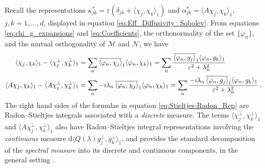 \documentclass[11pt]{amsart}
\renewcommand{\d}{\mathrm{d}}
\renewcommand{\Mc}{\mathcal{M}}
\newcommand{\Nc}{\mathcal{N}}
\begin{document}
Recall the representations $\kappa^*_{jk}=\varepsilon(\delta_{jk}+\langle\chi_j,\chi_k\rangle_1)$ and
$\alpha^*_{jk}=\langle A\chi_j,\chi_k\rangle_1$, $j,k=1,\ldots,d$, displayed in equation 
\eqref{eq:Eff_Diffusivity_Sobolev}. From equations
\eqref{eq:chi_g_expansions} and \eqref{eq:Coefficients}, the
orthonormality of the set $\{\varphi_n\}$, and the mutual orthogonality of
$\Mc$ and $\Nc$, we have 
%
\begin{align}\label{eq:Stieltjes-Radon_Rep}
  \langle\chi_j,\chi_k\rangle_1-\langle\chi_j^\perp,\chi_k^\perp\rangle_1&=\sum_n\overline{\langle\varphi_n,\chi_j\rangle}_1\langle\varphi_n,\chi_k\rangle_1
         =\sum_n\frac{\overline{\langle\varphi_n,g_j\rangle}_1\langle\varphi_n,g_k\rangle_1}{\varepsilon^2+\lambda_n^2}
         \\
  \langle A\chi_j,\chi_k\rangle_1-\langle A\chi_j^\perp,\chi_k^\perp\rangle_1&=\sum_n-\imath\lambda_n\,\overline{\langle\varphi_n,\chi_j\rangle}_1\langle\varphi_n,\chi_k\rangle_1
         =\sum_n\frac{-\imath\lambda_n\,\overline{\langle\varphi_n,g_j\rangle}_1\langle\varphi_n,g_k\rangle_1}{\varepsilon^2+\lambda_n^2}\,.
         \notag
\end{align}
%
The right hand sides of the formulas in equation
\eqref{eq:Stieltjes-Radon_Rep} are Radon--Stieltjes integrals
associated with a \emph{discrete} measure. The terms $\langle\chi_j^\perp,\chi_k^\perp\rangle_1$ and
$\langle A\chi_j^\perp,\chi_k^\perp\rangle_1$ also have Radon--Stieltjes integral representations
involving the \emph{continuous} measure $\d\langle Q(\lambda)g_j^\perp,g_k^\perp\rangle_1$, and
provides the standard decomposition of the \emph{spectral measure}
into its discrete and continuous components, in the general setting
\cite{Stone:64}. 
\end{document}
